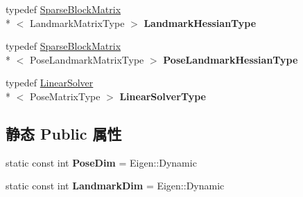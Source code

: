 \begin{DoxyCompactItemize}
\item 
\hypertarget{structg2o_1_1BlockSolverTraits_3_01Eigen_1_1Dynamic_00_01Eigen_1_1Dynamic_01_4_a73a81a0aeabd1216ae3a8f5700666ac4}{typedef \hyperlink{classg2o_1_1SparseBlockMatrix}{Sparse\-Block\-Matrix}\\*
$<$ Landmark\-Matrix\-Type $>$ {\bfseries Landmark\-Hessian\-Type}}\label{structg2o_1_1BlockSolverTraits_3_01Eigen_1_1Dynamic_00_01Eigen_1_1Dynamic_01_4_a73a81a0aeabd1216ae3a8f5700666ac4}

\item 
\hypertarget{structg2o_1_1BlockSolverTraits_3_01Eigen_1_1Dynamic_00_01Eigen_1_1Dynamic_01_4_aa6f67fd6ba29156f6d1069db0c3b5d11}{typedef \hyperlink{classg2o_1_1SparseBlockMatrix}{Sparse\-Block\-Matrix}\\*
$<$ Pose\-Landmark\-Matrix\-Type $>$ {\bfseries Pose\-Landmark\-Hessian\-Type}}\label{structg2o_1_1BlockSolverTraits_3_01Eigen_1_1Dynamic_00_01Eigen_1_1Dynamic_01_4_aa6f67fd6ba29156f6d1069db0c3b5d11}

\item 
\hypertarget{structg2o_1_1BlockSolverTraits_3_01Eigen_1_1Dynamic_00_01Eigen_1_1Dynamic_01_4_ad062ca3c21bf3a3e08d5350174d93d6d}{typedef \hyperlink{classg2o_1_1LinearSolver}{Linear\-Solver}\\*
$<$ Pose\-Matrix\-Type $>$ {\bfseries Linear\-Solver\-Type}}\label{structg2o_1_1BlockSolverTraits_3_01Eigen_1_1Dynamic_00_01Eigen_1_1Dynamic_01_4_ad062ca3c21bf3a3e08d5350174d93d6d}

\end{DoxyCompactItemize}
\subsection*{静态 Public 属性}
\begin{DoxyCompactItemize}
\item 
\hypertarget{structg2o_1_1BlockSolverTraits_3_01Eigen_1_1Dynamic_00_01Eigen_1_1Dynamic_01_4_a04a2cc2de80563b4b21f815150c3b0ec}{static const int {\bfseries Pose\-Dim} = Eigen\-::\-Dynamic}\label{structg2o_1_1BlockSolverTraits_3_01Eigen_1_1Dynamic_00_01Eigen_1_1Dynamic_01_4_a04a2cc2de80563b4b21f815150c3b0ec}

\item 
\hypertarget{structg2o_1_1BlockSolverTraits_3_01Eigen_1_1Dynamic_00_01Eigen_1_1Dynamic_01_4_aa8f7b7c3fc1ce4a7d61e925e3067e196}{static const int {\bfseries Landmark\-Dim} = Eigen\-::\-Dynamic}\label{structg2o_1_1BlockSolverTraits_3_01Eigen_1_1Dynamic_00_01Eigen_1_1Dynamic_01_4_aa8f7b7c3fc1ce4a7d61e925e3067e196}

\end{DoxyCompactItemize}



